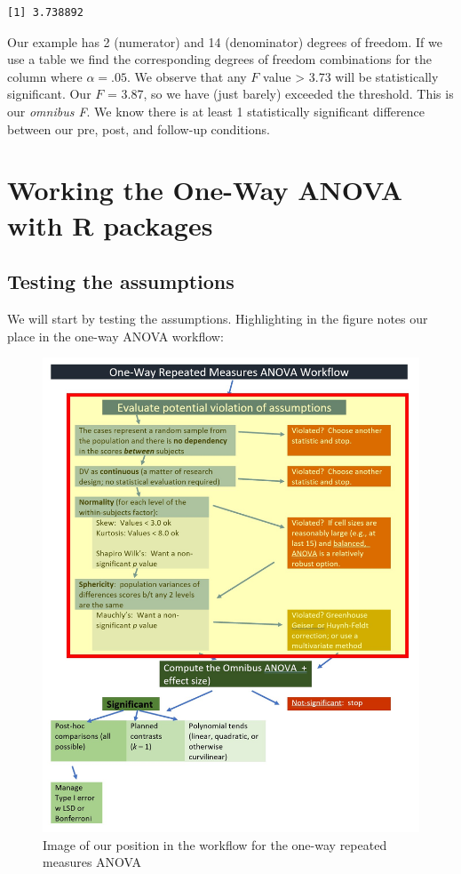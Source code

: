 \documentclass[
  11pt,
]{book}
\begin{document}
\begin{verbatim}
[1] 3.738892
\end{verbatim}

Our example has 2 (numerator) and 14 (denominator) degrees of freedom. If we use a table we find the corresponding degrees of freedom combinations for the column where \(\alpha = .05\). We observe that any \(F\) value \textgreater{} 3.73 will be statistically significant. Our \(F\) = 3.87, so we have (just barely) exceeded the threshold. This is our \emph{omnibus F}. We know there is at least 1 statistically significant difference between our pre, post, and follow-up conditions.

\hypertarget{working-the-one-way-anova-with-r-packages}{%
\section{Working the One-Way ANOVA with R packages}\label{working-the-one-way-anova-with-r-packages}}

\hypertarget{testing-the-assumptions}{%
\subsection{Testing the assumptions}\label{testing-the-assumptions}}

We will start by testing the assumptions. Highlighting in the figure notes our place in the one-way ANOVA workflow:

\begin{figure}
\centering
\includegraphics{images/oneway_repeated/wf_rptd_assumptions.jpg}
\caption{Image of our position in the workflow for the one-way repeated measures ANOVA}
\end{figure}
\end{document}
